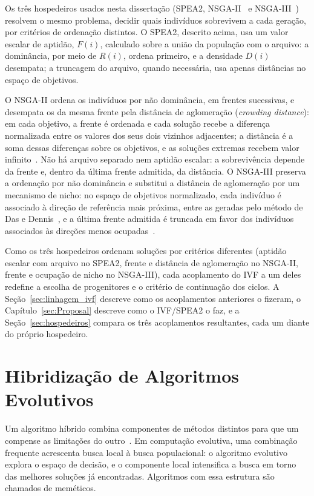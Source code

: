 Os três hospedeiros usados nesta dissertação (SPEA2, NSGA-II~\cite{deb2002fast} e NSGA-III~\cite{deb2014nsga3}) resolvem o mesmo problema, decidir quais indivíduos sobrevivem a cada geração, por critérios de ordenação distintos. O SPEA2, descrito acima, usa um valor escalar de aptidão, $F(i)$, calculado sobre a união da população com o arquivo: a dominância, por meio de $R(i)$, ordena primeiro, e a densidade $D(i)$ desempata; a truncagem do arquivo, quando necessária, usa apenas distâncias no espaço de objetivos.

O NSGA-II ordena os indivíduos por não dominância, em frentes sucessivas, e desempata os da mesma frente pela distância de aglomeração (\textit{crowding distance}): em cada objetivo, a frente é ordenada e cada solução recebe a diferença normalizada entre os valores dos seus dois vizinhos adjacentes; a distância é a soma dessas diferenças sobre os objetivos, e as soluções extremas recebem valor infinito~\cite{deb2002fast}. Não há arquivo separado nem aptidão escalar: a sobrevivência depende da frente e, dentro da última frente admitida, da distância. O NSGA-III preserva a ordenação por não dominância e substitui a distância de aglomeração por um mecanismo de nicho: no espaço de objetivos normalizado, cada indivíduo é associado à direção de referência mais próxima, entre as geradas pelo método de Das e Dennis~\cite{das1998normal}, e a última frente admitida é truncada em favor dos indivíduos associados às direções menos ocupadas~\cite{deb2014nsga3}.

Como os três hospedeiros ordenam soluções por critérios diferentes (aptidão escalar com arquivo no SPEA2, frente e distância de aglomeração no NSGA-II, frente e ocupação de nicho no NSGA-III), cada acoplamento do IVF a um deles redefine a escolha de progenitores e o critério de continuação dos ciclos. A Seção~\ref{sec:linhagem_ivf} descreve como os acoplamentos anteriores o fizeram, o Capítulo~\ref{sec:Proposal} descreve como o IVF/SPEA2 o faz, e a Seção~\ref{sec:hospedeiros} compara os três acoplamentos resultantes, cada um diante do próprio hospedeiro.

\section{Hibridização de Algoritmos Evolutivos}
\label{sec:hibridizacao}

Um algoritmo híbrido combina componentes de métodos distintos para que um compense as limitações do outro~\cite{talbi2002taxonomy}. Em computação evolutiva, uma combinação frequente acrescenta busca local à busca populacional: o algoritmo evolutivo explora o espaço de decisão, e o componente local intensifica a busca em torno das melhores soluções já encontradas. Algoritmos com essa estrutura são chamados de meméticos.


